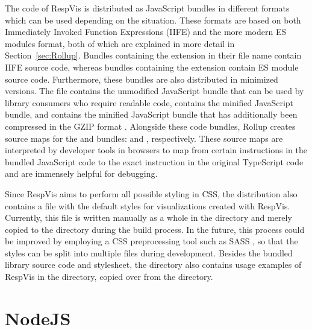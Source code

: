 The code of RespVis is distributed as JavaScript bundles in different
formats which can be used depending on the situation. These formats
are based on both Immediately Invoked Function Expressions (IIFE) and
the more modern ES modules format, both of which are explained in more
detail in Section~\ref{sec:Rollup}. Bundles containing the 
extension in their file name contain IIFE source code, whereas bundles
containing the  extension contain ES module source code.
Furthermore, these bundles are also distributed in minimized versions.
The  file contains the unmodified JavaScript
bundle that can be used by library consumers who require readable
code,  contains the minified JavaScript
bundle, and  contains the minified
JavaScript bundle that has additionally been compressed in the GZIP
format \parencite{GZIP}. Alongside these code bundles, Rollup creates
source maps for the  and
 bundles: 
and , respectively. These source maps
are interpreted by developer tools in browsers to map from certain
instructions in the bundled JavaScript code to the exact instruction
in the original TypeScript code and are immensely helpful for
debugging.

Since RespVis aims to perform all possible styling in CSS, the
distribution also contains a  file with the
default styles for visualizations created with RespVis. Currently,
this file is written manually as a whole in the  directory
and merely copied to the  directory during the build
process. In the future, this process could be improved by employing a
CSS preprocessing tool such as SASS \parencite{SASS}, so that the
styles can be split into multiple files during development. Besides
the bundled library source code and stylesheet, the 
directory also contains usage examples of RespVis in the
 directory, copied over from the
 directory.






\section{NodeJS}

